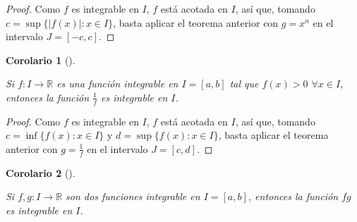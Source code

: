 \documentclass[
  a4paper,
]{scrreport}
\theoremstyle{definition}
\theoremstyle{plain}
\newtheorem{corollary}{Corolario}[chapter]
\theoremstyle{definition}
\theoremstyle{definition}
\theoremstyle{plain}
\theoremstyle{plain}
\theoremstyle{remark}
\begin{document}
\begin{tcolorbox}[enhanced jigsaw, leftrule=.75mm, colbacktitle=quarto-callout-note-color!10!white, toprule=.15mm, opacityback=0, opacitybacktitle=0.6, toptitle=1mm, breakable, bottomtitle=1mm, colframe=quarto-callout-note-color-frame, rightrule=.15mm, titlerule=0mm, title=\textcolor{quarto-callout-note-color}{\faInfo}\hspace{0.5em}{Demostración}, arc=.35mm, left=2mm, bottomrule=.15mm, colback=white, coltitle=black]

\begin{proof}
Como \(f\) es integrable en \(I\), \(f\) está acotada en \(I\), así que,
tomando \(c=\sup\{|f(x)|: x\in I\}\), basta aplicar el teorema anterior
con \(g=x^n\) en el intervalo \(J=[-c,c]\).
\end{proof}

\end{tcolorbox}

\begin{corollary}[]\protect\hypertarget{cor-integrabilidad-funcion-inversa}{}\label{cor-integrabilidad-funcion-inversa}

Si \(f:I\to\mathbb{R}\) es una función integrable en \(I=[a,b]\) tal que
\(f(x)>0\) \(\forall x\in I\), entonces la función \(\frac{1}{f}\) es
integrable en \(I\).

\end{corollary}

\begin{tcolorbox}[enhanced jigsaw, leftrule=.75mm, colbacktitle=quarto-callout-note-color!10!white, toprule=.15mm, opacityback=0, opacitybacktitle=0.6, toptitle=1mm, breakable, bottomtitle=1mm, colframe=quarto-callout-note-color-frame, rightrule=.15mm, titlerule=0mm, title=\textcolor{quarto-callout-note-color}{\faInfo}\hspace{0.5em}{Demostración}, arc=.35mm, left=2mm, bottomrule=.15mm, colback=white, coltitle=black]

\begin{proof}
Como \(f\) es integrable en \(I\), \(f\) está acotada en \(I\), así que,
tomando \(c=\inf\{f(x): x\in I\}\) y \(d=\sup\{f(x): x\in I\}\), basta
aplicar el teorema anterior con \(g=\frac{1}{f}\) en el intervalo
\(J=[c,d]\).
\end{proof}

\end{tcolorbox}

\begin{corollary}[]\protect\hypertarget{cor-integrabilidad-funcion-producto}{}\label{cor-integrabilidad-funcion-producto}

Si \(f,g:I\to\mathbb{R}\) son dos funciones integrable en \(I=[a,b]\),
entonces la función \(fg\) es integrable en \(I\).

\end{corollary}
\end{document}
